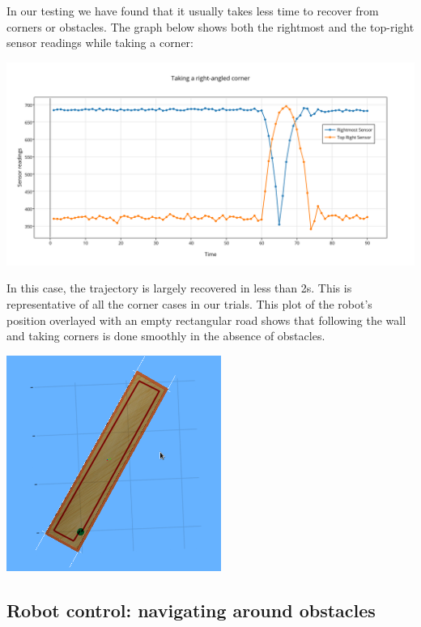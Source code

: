 \documentclass[10pt,a4paper]{article}
\begin{document}
\begin{samepage}
In our testing we have found that it usually takes less time to recover
from corners or obstacles. The graph below shows both the rightmost and
the top-right sensor readings while taking a corner:

\begin{center}
\includegraphics[width=15cm]{images/taking_a_right-angled_corner.png} 
\end{center}
\end{samepage}

In this case,
the trajectory is largely recovered in less than 2s. This is
representative of all the corner cases in our trials. This plot of the
robot's position overlayed with an empty rectangular road shows that
following the wall and taking corners is done smoothly in the absence of
obstacles. 

\begin{center}
\includegraphics[width=7cm]{images/empty_world_overlay.png}
\end{center}

\subsection{Robot control: navigating around
obstacles}\label{robot-control-navigating-around-obstacles}
\end{document}

